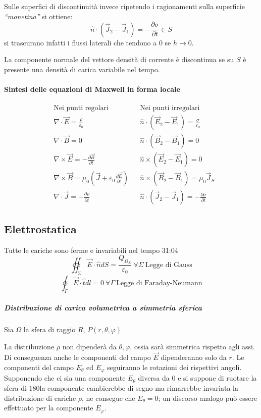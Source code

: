 Sulle superfici di discontinuità invece ripetendo i ragionamenti sulla superficie \textit{``monetina''}
si ottiene:
$$
\hat{n}\cdot\left(\vec{J}_2-\vec{J}_1\right) = -\frac{\partial\sigma}{\partial t} \in S
$$
si trascurano infatti i flussi laterali che tendono a 0 se $h\to 0$.

La componente normale del vettore densità di corrente è discontinua se su $S$ è presente una densità
di carica variabile nel tempo.

\paragraph{Sintesi delle equazioni di Maxwell in forma locale} 
\begin{align*}
&\text{Nei punti}\text{ regolari}  & &\text{Nei punti}\text{ irreg}\text{olari}\\
&\nabla\cdot\vec{E} = \frac{\rho}{\varepsilon_0} & &\hat{n}\cdot(\vec{E}_2-\vec{E}_1) = \frac{\sigma}{\varepsilon_0}\\
&\nabla\cdot\vec{B} = 0 & &\hat{n}\cdot(\vec{B}_2-\vec{B}_1) = 0\\
&\nabla\times\vec{E} = -\frac{\partial\vec{B}}{\partial t}& &\hat{n}\times(\vec{E}_2-\vec{E}_1) = 0\\
&\nabla\times\vec{B} = \mu_0\left(\vec{J} + \varepsilon_0\frac{\partial\vec{E}}{\partial t}\right)& &\hat{n}\times(\vec{B}_2-\vec{B}_1) = \mu_0\vec{J}_S \\
&\nabla\cdot\vec{J} = -\frac{\partial\rho}{\partial t} & &\hat{n}\cdot(\vec{J}_2-\vec{J}_1) = -\frac{\partial \sigma}{\partial t}
\end{align*}

\subsection{Elettrostatica}
Tutte le cariche sono ferme e invariabili nel tempo 31:04
$$
\oiint_\Sigma \vec{E}\cdot\hat{n}dS = \frac{Q_{\Omega_\Sigma}}{\varepsilon_0}\ \forall\Sigma\ \text{Legge di Gauss}
$$
$$
\oint_\Gamma \vec{E}\cdot\hat{t}dl = 0 \ \forall\Gamma\ \text{Legge di Faraday-Neumann}
$$

\subparagraph{Distribuzione di carica volumetrica a simmetria sferica}

Sia $\Omega$ la sfera di raggio $R$, $P(r,\theta,\varphi)$

La distribuzione $\rho$ non dipenderà da $\theta,\varphi$, ossia sarà simmetrica rispetto agli assi.
Di conseguenza anche le componenti del campo $\vec{E}$ dipenderanno solo da $r$.
Le componenti del campo $E_\theta$ ed $E_\varphi$ seguiranno le rotazioni dei rispettivi angoli.
Supponendo che ci sia una componente $E_\theta$ diversa da 0 e si suppone di ruotare la sfera di
180\textdegree la componente cambierebbe di segno ma rimarrebbe invariata la distribuzione di cariche $\rho$,
ne consegue che $E_\theta = 0$; un discorso analogo può essere effettuato per la componente $E_\varphi$.

